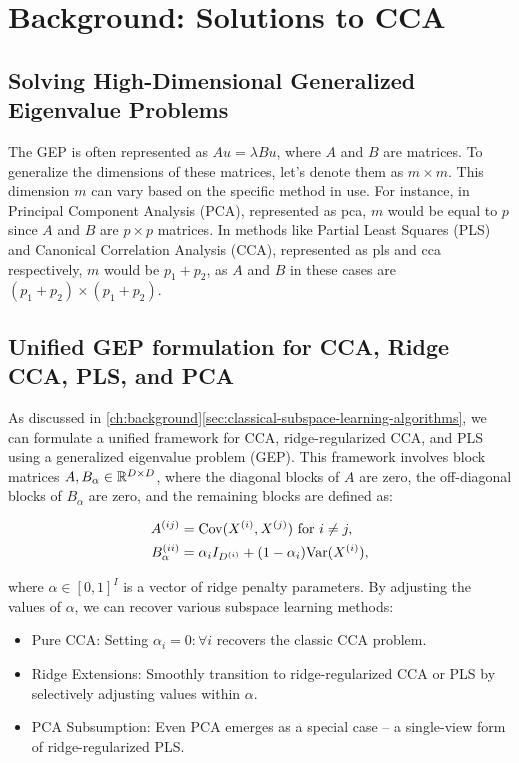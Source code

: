 \section{Background: Solutions to CCA}\label{sec:background-unified}

\subsection{Solving High-Dimensional Generalized Eigenvalue Problems}

The GEP is often represented as \( Au = \lambda Bu \), where \( A \) and \( B \) are matrices. To generalize the dimensions of these matrices, let's denote them as \( m \times m \). This dimension \( m \) can vary based on the specific method in use. For instance, in Principal Component Analysis (PCA), represented as \acrshort{pca}, \( m \) would be equal to \( p \) since \( A \) and \( B \) are \( p \times p \) matrices. In methods like Partial Least Squares (PLS) and Canonical Correlation Analysis (CCA), represented as \acrshort{pls} and \acrshort{cca} respectively, \( m \) would be \( p_1+p_2 \), as \( A \) and \( B \) in these cases are \( (p_1+p_2) \times (p_1+p_2) \).


\subsection{Unified GEP formulation for CCA, Ridge CCA, PLS, and PCA} 
As discussed in \ref{ch:background}\ref{sec:classical-subspace-learning-algorithms}, we can formulate a unified framework for CCA, ridge-regularized CCA, and PLS using a generalized eigenvalue problem (GEP). This framework involves block matrices $A,B_\alpha \in \mathbb{R}^{D \times D}$, where the diagonal blocks of $A$ are zero, the off-diagonal blocks of $B_\alpha$ are zero, and the remaining blocks are defined as:

\begin{align}
A^{(ij)} &= \mathrm{Cov}(X^{(i)}, X^{(j)}) \text{ for } i \neq j, \\
B_\alpha^{(ii)} &= \alpha_i I_{D^{(i)}} + (1-\alpha_i) \mathrm{Var}(X^{(i)}),
\end{align}

where $\alpha \in [0,1]^I$ is a vector of ridge penalty parameters. By adjusting the values of $\alpha$, we can recover various subspace learning methods:

\begin{itemize}
\item Pure CCA: Setting $\alpha_i = 0 : \forall i$ recovers the classic CCA problem.
\item Ridge Extensions: Smoothly transition to ridge-regularized CCA or PLS by selectively adjusting values within \(\alpha\).
\item PCA Subsumption: Even PCA emerges as a special case – a single-view form of ridge-regularized PLS.
\end{itemize}

